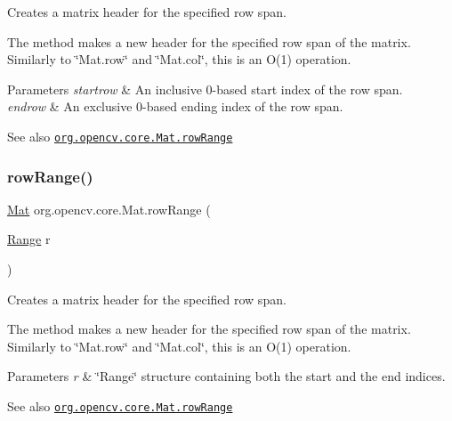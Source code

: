 Creates a matrix header for the specified row span.

The method makes a new header for the specified row span of the matrix. Similarly to \char`\"{}\+Mat.\+row\char`\"{} and \char`\"{}\+Mat.\+col\char`\"{}, this is an O(1) operation.


\begin{DoxyParams}{Parameters}
{\em startrow} & An inclusive 0-\/based start index of the row span. \\
\hline
{\em endrow} & An exclusive 0-\/based ending index of the row span.\\
\hline
\end{DoxyParams}
\begin{DoxySeeAlso}{See also}
\href{http://docs.opencv.org/modules/core/doc/basic_structures.html#mat-rowrange}{\tt org.\+opencv.\+core.\+Mat.\+row\+Range} 
\end{DoxySeeAlso}
\mbox{\label{classorg_1_1opencv_1_1core_1_1_mat_a05a7c23da0150252d907e58489808b51}} 
\subsubsection{\texorpdfstring{row\+Range()}{rowRange()}\hspace{0.1cm}{\footnotesize\ttfamily [2/2]}}
{\footnotesize\ttfamily \mbox{\hyperlink{classorg_1_1opencv_1_1core_1_1_mat}{Mat}} org.\+opencv.\+core.\+Mat.\+row\+Range (\begin{DoxyParamCaption}\item[{\mbox{\hyperlink{classorg_1_1opencv_1_1core_1_1_range}{Range}}}]{r }\end{DoxyParamCaption})}

Creates a matrix header for the specified row span.

The method makes a new header for the specified row span of the matrix. Similarly to \char`\"{}\+Mat.\+row\char`\"{} and \char`\"{}\+Mat.\+col\char`\"{}, this is an O(1) operation.


\begin{DoxyParams}{Parameters}
{\em r} & \char`\"{}\+Range\char`\"{} structure containing both the start and the end indices.\\
\hline
\end{DoxyParams}
\begin{DoxySeeAlso}{See also}
\href{http://docs.opencv.org/modules/core/doc/basic_structures.html#mat-rowrange}{\tt org.\+opencv.\+core.\+Mat.\+row\+Range} 
\end{DoxySeeAlso}
\mbox{\label{classorg_1_1opencv_1_1core_1_1_mat_a1e925483fbe84a9dab2499cf91c17c84}} 

